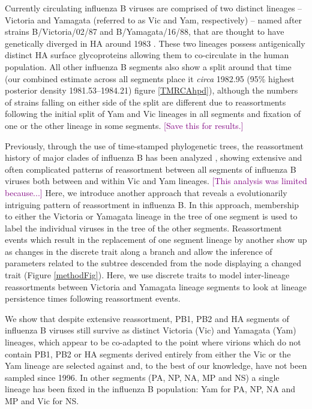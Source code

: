 \documentclass[11pt,oneside,letterpaper]{article}
\def\tbc#1{\textcolor{purple}{[#1]}}
\begin{document}
Currently circulating influenza B viruses are comprised of two distinct lineages -- Victoria and Yamagata (referred to as Vic and Yam, respectively) -- named after strains B/Victoria/02/87 and B/Yamagata/16/88, that are thought to have genetically diverged in HA around 1983 \cite{rota1990}. 
These two lineages possess antigenically distinct HA surface glycoproteins allowing them to co-circulate in the human population.
All other influenza B segments also show a split around that time (our combined estimate across all segments place it \textit{circa} 1982.95 (95\% highest posterior density 1981.53--1984.21) figure \ref{TMRCAhpd}), although the numbers of strains falling on either side of the split are different due to reassortments following the initial split of Yam and Vic lineages in all segments and fixation of one or the other lineage in some segments. \tbc{Save this for results.}

Previously, through the use of time-stamped phylogenetic trees, the reassortment history of major clades of influenza B has been analyzed \cite{chen2008}, showing extensive and often complicated patterns of reassortment between all segments of influenza B viruses both between and within Vic and Yam lineages.
\tbc{This analysis was limited because...}
Here, we introduce another approach that reveals a evolutionarily intriguing pattern of reassortment in influenza B.
In this approach, membership to either the Victoria or Yamagata lineage in the tree of one segment is used to label the individual viruses in the tree of the other segments.
Reassortment events which result in the replacement of one segment lineage by another show up as changes in the discrete trait along a branch and allow the inference of parameters related to the subtree descended from the node displaying a changed trait (Figure \ref{methodFig}).
Here, we use discrete traits to model inter-lineage reassortments between Victoria and Yamagata lineage segments to look at lineage persistence times following reassortment events. 

We show that despite extensive reassortment, PB1, PB2 and HA segments of influenza B viruses still survive as distinct Victoria (Vic) and Yamagata (Yam) lineages, which appear to be co-adapted to the point where virions which do not contain PB1, PB2 or HA segments derived entirely from either the Vic or the Yam lineage are selected against and, to the best of our knowledge, have not been sampled since 1996.
In other segments (PA, NP, NA, MP and NS) a single lineage has been fixed in the influenza B population: Yam for PA, NP, NA and MP and Vic for NS.
\end{document}
